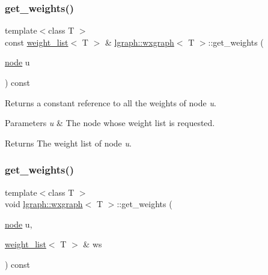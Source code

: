 \subsubsection{\texorpdfstring{get\+\_\+weights()}{get\_weights()}\hspace{0.1cm}{\footnotesize\ttfamily [1/2]}}
{\footnotesize\ttfamily template$<$class T $>$ \\
const \hyperlink{namespacelgraph_a1e0fd5ef0a78b2a92da48adbed265cb6}{weight\+\_\+list}$<$ T $>$ \& \hyperlink{classlgraph_1_1wxgraph}{lgraph\+::wxgraph}$<$ T $>$\+::get\+\_\+weights (\begin{DoxyParamCaption}\item[{\hyperlink{namespacelgraph_a397169dd66adf725210a30fb7251773e}{node}}]{u }\end{DoxyParamCaption}) const\hspace{0.3cm}{\ttfamily [inherited]}}



Returns a constant reference to all the weights of node {\itshape u}. 


\begin{DoxyParams}{Parameters}
{\em u} & The node whose weight list is requested. \\
\hline
\end{DoxyParams}
\begin{DoxyReturn}{Returns}
The weight list of node {\itshape u}. 
\end{DoxyReturn}
\mbox{\label{classlgraph_1_1wxgraph_a423a6e9eb99fd40d9aae73e7ff5adca9}} 
\subsubsection{\texorpdfstring{get\+\_\+weights()}{get\_weights()}\hspace{0.1cm}{\footnotesize\ttfamily [2/2]}}
{\footnotesize\ttfamily template$<$class T $>$ \\
void \hyperlink{classlgraph_1_1wxgraph}{lgraph\+::wxgraph}$<$ T $>$\+::get\+\_\+weights (\begin{DoxyParamCaption}\item[{\hyperlink{namespacelgraph_a397169dd66adf725210a30fb7251773e}{node}}]{u,  }\item[{\hyperlink{namespacelgraph_a1e0fd5ef0a78b2a92da48adbed265cb6}{weight\+\_\+list}$<$ T $>$ \&}]{ws }\end{DoxyParamCaption}) const\hspace{0.3cm}{\ttfamily [inherited]}}



